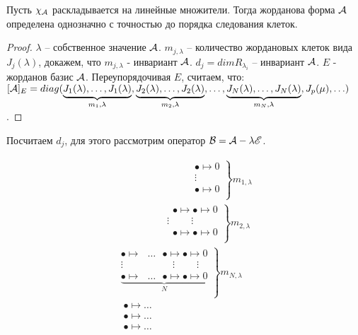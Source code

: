 \documentclass[main]{subfiles}
\begin{document}
\begin{proposition}
  Пусть $\chi_{\mathcal{A}}$ раскладывается на линейные множители. Тогда жорданова форма $\mathcal{A}$
  определена однозначно с точностью до порядка следования клеток.
\end{proposition}

\begin{proof}
  $\lambda$ -- собственное значение $\mathcal{A}$. $m_{j, \lambda}$ -- количество жордановых клеток вида
  $J_j(\lambda)$, докажем, что $m_{j, \lambda}$ - инвариант $\mathcal{A}$. $d_j = dim R_{\lambda_i}$ -- инвариант $\mathcal{A}$.
  $E$ - жорданов базис $\mathcal{A}$. Переупорядочивая $E$, считаем, что:
  $[\mathcal{A}]_E = diag(\underbrace{J_1(\lambda), \ldots, J_1(\lambda)}_{m_1, \lambda}, \underbrace{J_2(\lambda), \ldots, J_2(\lambda)}_{m_2, \lambda}, \ldots, \underbrace{J_N(\lambda), \ldots, J_N(\lambda)}_{m_N, \lambda}, J_p(\mu), \ldots)$.

\end{proof}

\newpage

Посчитаем $d_j$, для этого рассмотрим оператор $\mathcal{B} = \mathcal{A} - \lambda \mathscr{E}$.

\begin{gather*}
  \left.
  \begin{array}{ccc}
    \ \quad \quad \quad \quad \quad \quad \quad \ \bullet\longmapsto 0 \\
    \ \quad \quad \quad \quad \quad \quad \quad \ \vdots               \\
    \ \quad \quad \quad \quad \quad \quad \quad \ \bullet\longmapsto 0 \\
  \end{array}
  \right\} m_{1,\lambda} \\
  \left.
  \begin{array}{ccc}
    \ \quad \quad \quad \quad \quad \bullet \longmapsto \bullet \longmapsto 0  \\
    \ \quad \quad \quad \quad \ \ \vdots \quad \quad \ \vdots                  \\
    \ \quad \quad \quad \quad \quad  \bullet \longmapsto \bullet \longmapsto 0 \\
  \end{array}
  \right\} m_{2,\lambda} \\
  \left.
  \begin{array}{ccc}
    \bullet \longmapsto \ \ \  \dots \ \ \  \bullet\longmapsto\bullet\longmapsto 0                 \\
    \vdots \quad \quad \quad \quad \quad  \vdots \quad \quad \ \vdots                              \\
    \underbrace{\bullet\longmapsto \ \ \  \dots \ \ \  \bullet\longmapsto\bullet\longmapsto 0}_{N} \\
  \end{array}
  \right\} m_{N,\lambda} \\
  \text{ } \bullet\longmapsto \dots \\
  \text{ } \bullet\longmapsto \dots \\
  \text{ } \bullet\longmapsto \dots \\
\end{gather*}
\end{document}
